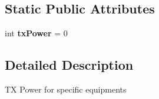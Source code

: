 \subsection*{Static Public Attributes}
\begin{DoxyCompactItemize}
\item 
\hypertarget{classmininet_1_1wifiDevices_1_1deviceTxPower_a9469bf2bc36993762b237fc8bb76bc59}{int {\bfseries tx\-Power} = 0}\label{classmininet_1_1wifiDevices_1_1deviceTxPower_a9469bf2bc36993762b237fc8bb76bc59}

\end{DoxyCompactItemize}


\subsection{Detailed Description}
\begin{DoxyVerb}TX Power for specific equipments \end{DoxyVerb}
 

